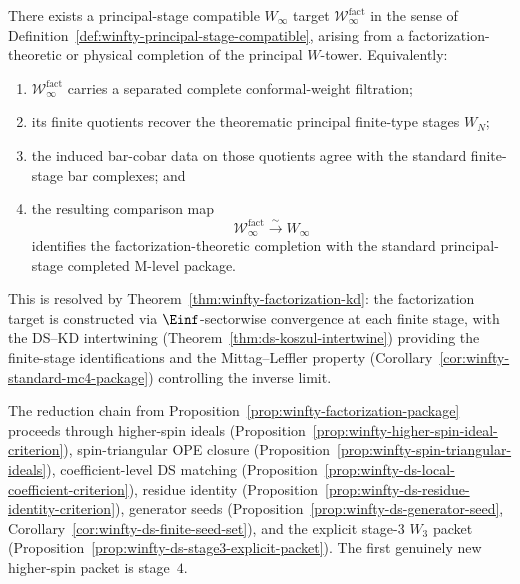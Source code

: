\begin{proposition}
\label{prop:winfty-factorization-package}
There exists a principal-stage compatible $W_\infty$ target
$\mathcal{W}^{\mathrm{fact}}_\infty$ in the sense of
Definition~\ref{def:winfty-principal-stage-compatible}, arising from a
factorization-theoretic or physical completion of the principal
$W$-tower.  Equivalently:
\begin{enumerate}
\item $\mathcal{W}^{\mathrm{fact}}_\infty$ carries a separated complete
  conformal-weight filtration;
\item its finite quotients recover the theorematic principal finite-type
  stages $W_N$;
\item the induced bar-cobar data on those quotients agree with the
  standard finite-stage bar complexes; and
\item the resulting comparison map
  \[
  \mathcal{W}^{\mathrm{fact}}_\infty \xrightarrow{\sim} W_\infty
  \]
  identifies the factorization-theoretic completion with the standard
  principal-stage completed M-level package.
\end{enumerate}
This is resolved by
Theorem~\ref{thm:winfty-factorization-kd}: the factorization
target is constructed via $\Einf$-sectorwise convergence at each
finite stage, with the DS--KD intertwining
(Theorem~\ref{thm:ds-koszul-intertwine}) providing the
finite-stage identifications and the Mittag--Leffler property
(Corollary~\ref{cor:winfty-standard-mc4-package}) controlling
the inverse limit.
\end{proposition}

\begin{remark}
\label{rem:winfty-factorization-route}
The reduction chain from
Proposition~\ref{prop:winfty-factorization-package} proceeds through
higher-spin ideals
(Proposition~\ref{prop:winfty-higher-spin-ideal-criterion}),
spin-triangular OPE closure
(Proposition~\ref{prop:winfty-spin-triangular-ideals}),
coefficient-level DS matching
(Proposition~\ref{prop:winfty-ds-local-coefficient-criterion}),
residue identity
(Proposition~\ref{prop:winfty-ds-residue-identity-criterion}),
generator seeds
(Proposition~\ref{prop:winfty-ds-generator-seed},
Corollary~\ref{cor:winfty-ds-finite-seed-set}),
and the explicit stage-$3$ $W_3$ packet
(Proposition~\ref{prop:winfty-ds-stage3-explicit-packet}).
The first genuinely new higher-spin packet is stage~$4$.
\end{remark}

